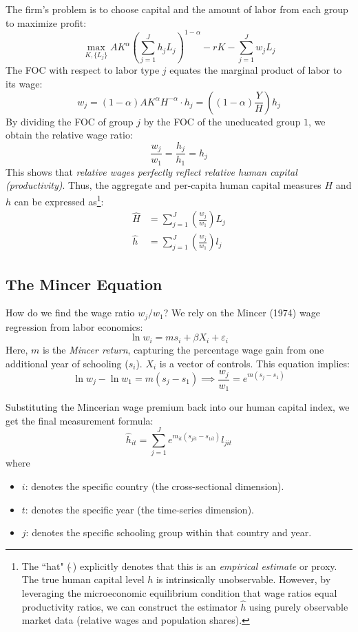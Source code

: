 The firm's problem is to choose capital and the amount of labor from each group to maximize profit:
\[
\max_{K, \{L_j\}} A K^{\alpha} \left(\sum_{j=1}^J h_j L_j\right)^{1-\alpha} - r K - \sum_{j=1}^J w_j L_j
\]
The FOC with respect to labor type $j$ equates the marginal product of labor to its wage:
\[
w_j = (1-\alpha) A K^\alpha H^{-\alpha} \cdot h_j = \left( (1-\alpha)\frac{Y}{H} \right) h_j
\]
By dividing the FOC of group $j$ by the FOC of the uneducated group $1$, we obtain the relative wage ratio:
\[
\frac{w_j}{w_1} = \frac{h_j}{h_1} = h_j
\]
This shows that \textit{relative wages perfectly reflect relative human capital (productivity)}. Thus, the aggregate and per-capita human capital measures $H$ and $h$ can be expressed as\footnote{
    The ``hat" ($\hat{\ }$) explicitly denotes that this is an \textit{empirical estimate} or proxy. The true human capital level $h$ is intrinsically unobservable. However, by leveraging the microeconomic equilibrium condition that wage ratios equal productivity ratios, we can construct the estimator $\hat{h}$ using purely observable market data (relative wages and population shares).
}:
\[
\begin{aligned}
    \hat H & = \sum_{j = 1}^J \left(\frac{w_j}{w_1}\right) L_j\\
\hat{h} & = \sum_{j = 1}^J \left(\frac{w_j}{w_1}\right) l_j
\end{aligned}
\]

\subsection{The Mincer Equation}
How do we find the wage ratio $w_j/w_1$? We rely on the Mincer (1974) wage regression from labor economics:
\[
\ln w_i = m s_i + \beta X_i + \varepsilon_i
\]
Here, $m$ is the \textit{Mincer return}, capturing the percentage wage gain from one additional year of schooling ($s_i$). $X_i$ is a vector of controls. This equation implies:
\[
\ln w_j - \ln w_1 = m(s_j - s_1) \implies \frac{w_j}{w_1} = e^{m(s_j - s_1)}
\]

Substituting the Mincerian wage premium back into our human capital index, we get the final measurement formula:
\[
\hat{h}_{it} = \sum_{j = 1}^J e^{m_{it}(s_{jit} - s_{1it})} l_{jit}
\]
where 
\begin{itemize}
    \item $i$: denotes the specific country (the cross-sectional dimension).
    \item $t$: denotes the specific year (the time-series dimension).
    \item $j$: denotes the specific schooling group within that country and year.
\end{itemize}

